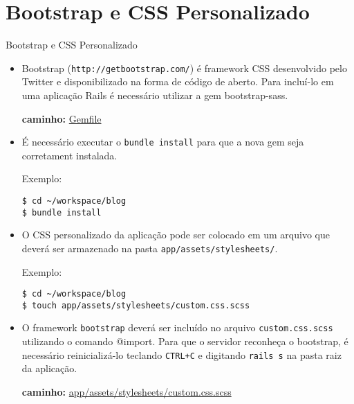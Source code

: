 \section{Bootstrap e CSS Personalizado}
\begin{frame}{Bootstrap e CSS Personalizado}
    \begin{itemize}
      \item  Bootstrap (\verb!http://getbootstrap.com/!) é framework CSS desenvolvido
        pelo Twitter e disponibilizado na forma de código de aberto. Para incluí-lo
        em uma aplicação Rails é necessário utilizar a gem \alert{bootstrap-sass}.
      \begin{exampleblock}{\tiny\textbf{caminho: }\url{Gemfile}}
        
      \end{exampleblock}
      
      \item É necessário executar o \verb!bundle install! para que a nova gem seja corretament
        instalada.
      \begin{exampleblock}{Exemplo:}
          \begin{lstlisting}[style=BashInputStyle]
$ cd ~/workspace/blog
$ bundle install
          \end{lstlisting}
      \end{exampleblock}
      
      \item O CSS personalizado da aplicação pode ser colocado em um arquivo que 
        deverá ser armazenado na pasta \verb!app/assets/stylesheets/!. 
      \begin{exampleblock}{Exemplo:}
          \begin{lstlisting}[style=BashInputStyle]
$ cd ~/workspace/blog
$ touch app/assets/stylesheets/custom.css.scss
          \end{lstlisting}
      \end{exampleblock}
      
      \item O framework \verb!bootstrap! deverá ser incluído no arquivo \verb!custom.css.scss!
      utilizando o comando \alert{@import}. Para que o servidor reconheça o bootstrap, é necessário
      reinicializá-lo teclando \verb!CTRL+C! e digitando \verb!rails s! na pasta raiz da aplicação.
      \begin{exampleblock}{\tiny\textbf{caminho: }\url{app/assets/stylesheets/custom.css.scss}}
        
      \end{exampleblock}
      

\end{itemize}
\end{frame}
